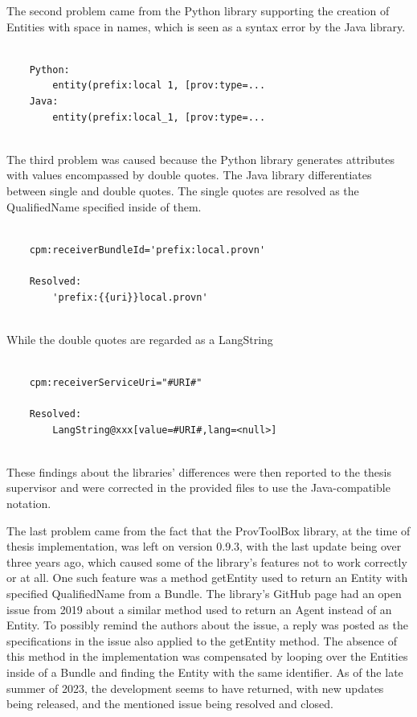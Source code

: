 \documentclass[
  digital,     %
  oneside,     %
  nosansbold,  %
  nocolorbold, %
  lof,         %
  lot,         %
]{fithesis4}
\begin{document}
The second problem came from the Python library supporting the creation of Entities with space in names, which is seen as a syntax error by the Java library.

\begin{verbatim}

    Python:
        entity(prefix:local 1, [prov:type=...
    Java:
        entity(prefix:local_1, [prov:type=... 
        
\end{verbatim}

The third problem was caused because the Python library generates attributes with values encompassed by double quotes. The Java library differentiates between single and double quotes. The single quotes are resolved as the QualifiedName specified inside of them.

\begin{verbatim}

    cpm:receiverBundleId='prefix:local.provn'
    
    Resolved:
        'prefix:{{uri}}local.provn'
        
\end{verbatim}

While the double quotes are regarded as a LangString

\begin{verbatim}

    cpm:receiverServiceUri="#URI#"
    
    Resolved:
        LangString@xxx[value=#URI#,lang=<null>]
        
\end{verbatim}

These findings about the libraries' differences were then reported to the thesis supervisor and were corrected in the provided files to use the Java-compatible notation.

The last problem came from the fact that the ProvToolBox library, at the time of thesis implementation, was left on version 0.9.3, with the last update being over three years ago, which caused some of the library's features not to work correctly or at all. One such feature was a method getEntity used to return an Entity with specified QualifiedName from a Bundle. The library's GitHub page had an open issue from 2019 about a similar method used to return an Agent instead of an Entity. To possibly remind the authors about the issue, a reply was posted as the specifications in the issue also applied to the getEntity method. The absence of this method in the implementation was compensated by looping over the Entities inside of a Bundle and finding the Entity with the same identifier. As of the late summer of 2023, the development seems to have returned, with new updates being released, and the mentioned issue being resolved and closed.
\shorthandon{-}
\end{document}
